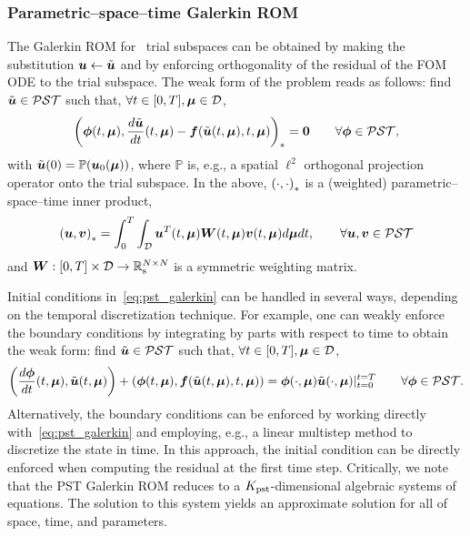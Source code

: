 \documentclass[3p,computermodern,10pt]{elsarticle}
\begin{document}
\subsubsection{Parametric--space--time Galerkin ROM}
The Galerkin ROM for \parametricSpaceTimeAcronym\ trial subspaces can be obtained by making the substitution $\boldsymbol u \leftarrow \tilde{\boldsymbol u}$ and by enforcing orthogonality of the residual of the FOM ODE to the trial subspace. The weak form of the problem reads as follows: find $\tilde{\boldsymbol u} \in \mathcal{PST}$ such that, $\forall t \in [0,T], \boldsymbol \mu \in \mathcal{D}$,
\begin{equation}\label{eq:pst_galerkin}
\left(  \boldsymbol \phi(t,\boldsymbol \mu) ,  \frac{d \tilde{\boldsymbol u}}{dt}(t,\boldsymbol \mu) - \boldsymbol f(\tilde{\boldsymbol u}(t,\boldsymbol \mu),t,\boldsymbol \mu)  \right)_{*} = \boldsymbol 0 \qquad \forall \boldsymbol \phi \in  \mathcal{PST} ,
\end{equation}
with $\tilde{\boldsymbol u}(0) = \mathbb{P}(\boldsymbol u_0(\boldsymbol \mu))$, where $\mathbb{P}$ is, e.g., a spatial $\ell^2$ orthogonal projection operator onto the trial subspace. In the above, $\left( \cdot, \cdot \right)_{*}$ is a (weighted) parametric--space--time inner product, 
$$\left( \boldsymbol u,  \boldsymbol v \right)_{*} = \int_0^T \int _{\mathcal{D}} \boldsymbol u^T(t,\boldsymbol \mu) \boldsymbol W (t,\boldsymbol \mu)\boldsymbol v(t,\boldsymbol \mu)  d \boldsymbol \mu dt, \qquad \forall \boldsymbol u, \boldsymbol v \in \mathcal{PST}$$ 
and $\boldsymbol W : [0,T] \times \mathcal{D} \rightarrow \mathbb{R}_{\text{s}}^{N\times N}$ is a symmetric weighting matrix.

Initial conditions in~\eqref{eq:pst_galerkin} can be handled in several ways, depending on the temporal discretization technique. For example, one can weakly enforce the boundary conditions by integrating by parts with respect to time to obtain the weak form: find $\tilde{\boldsymbol u} \in \mathcal{PST}$ such that, $\forall t \in [0,T], \boldsymbol \mu \in \mathcal{D}$,
$$\left( \frac{d\boldsymbol \phi}{dt}(t,\boldsymbol \mu) ,\tilde{\boldsymbol u}(t,\boldsymbol \mu) \right) + \left(\boldsymbol \phi(t,\boldsymbol \mu),  \boldsymbol f(\tilde{\boldsymbol u}(t,\boldsymbol \mu),t,\boldsymbol \mu) \right)  = \boldsymbol \phi(\cdot,\boldsymbol \mu) \tilde{\boldsymbol u}(\cdot,\boldsymbol \mu) |_{t=0}^{t=T}\qquad \forall \boldsymbol \phi \in  \mathcal{PST}.$$
Alternatively, the boundary conditions can be enforced by working directly with~\eqref{eq:pst_galerkin} and employing, e.g., a linear multistep method to discretize the state in time. In this approach, the initial condition can be directly enforced when computing the residual at the first time step. Critically, we note that the PST Galerkin ROM reduces to a $K_{\text{pst}}$-dimensional algebraic systems of equations. The solution to this system yields an approximate solution for all of space, time, and parameters. 
\end{document}

